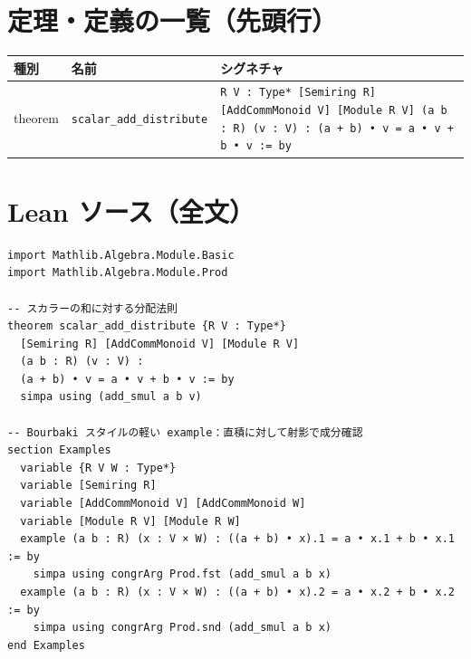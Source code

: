 \documentclass[12pt]{article}
\theoremstyle{definition}
\begin{document}
\section*{定理・定義の一覧（先頭行）}
\begin{center}
\begin{tabular}{lll}
\textbf{種別} & \textbf{名前} & \textbf{シグネチャ} \\ \hline
theorem & \texttt{scalar\_add\_distribute} & \texttt{{R V : Type*} [Semiring R] [AddCommMonoid V] [Module R V] (a b : R) (v : V) : (a + b) • v = a • v + b • v := by} \\
\end{tabular}
\end{center}

\section*{Lean ソース（全文）}
\begin{lstlisting}
import Mathlib.Algebra.Module.Basic
import Mathlib.Algebra.Module.Prod

-- スカラーの和に対する分配法則
theorem scalar_add_distribute {R V : Type*} 
  [Semiring R] [AddCommMonoid V] [Module R V]
  (a b : R) (v : V) : 
  (a + b) • v = a • v + b • v := by
  simpa using (add_smul a b v)

-- Bourbaki スタイルの軽い example：直積に対して射影で成分確認
section Examples
  variable {R V W : Type*}
  variable [Semiring R]
  variable [AddCommMonoid V] [AddCommMonoid W]
  variable [Module R V] [Module R W]
  example (a b : R) (x : V × W) : ((a + b) • x).1 = a • x.1 + b • x.1 := by
    simpa using congrArg Prod.fst (add_smul a b x)
  example (a b : R) (x : V × W) : ((a + b) • x).2 = a • x.2 + b • x.2 := by
    simpa using congrArg Prod.snd (add_smul a b x)
end Examples

\end{lstlisting}
\end{document}
